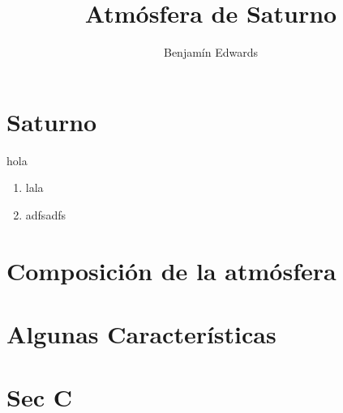 \documentclass{beamer}
\title{Atmósfera de Saturno}
\author{Benjamín Edwards}
\begin{document}
\frame{\titlepage}

\section{Saturno}

\begin{frame}
hola

\begin{enumerate}
    \item lala
    \item adfsadfs
\end{enumerate}

\end{frame}

\section{Composición de la atmósfera}
\section{Algunas Características}
\section{Sec C}

\end{document}
